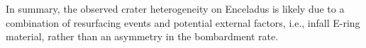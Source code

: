 \documentclass[preprint,12pt,3p,times,authoryear]{elsarticle}
\begin{document}
In summary, the observed crater heterogeneity on Enceladus is likely due to a combination of resurfacing events and potential external factors, i.e., infall E-ring material, rather than an asymmetry in the bombardment rate.


 
{}
\end{document}
